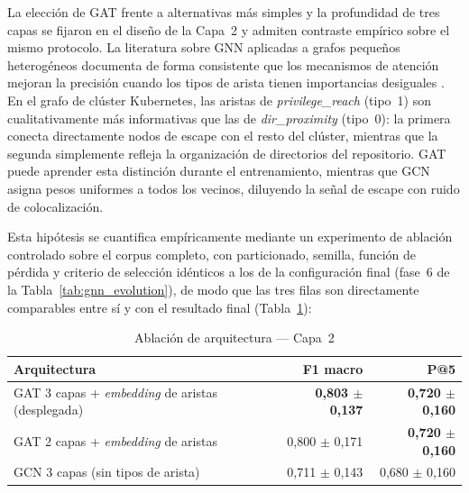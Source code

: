 La elección de \ac{GAT} frente a alternativas más simples y la profundidad de
tres capas se fijaron en el diseño de la Capa~2 y admiten contraste empírico
sobre el mismo protocolo. La literatura sobre \acs{GNN} aplicadas a grafos
pequeños heterogéneos documenta de forma consistente que los mecanismos de
atención mejoran la precisión cuando los tipos de arista tienen importancias
desiguales \citep{Velickovic2018}. En el grafo de clúster
Kubernetes, las aristas de \textit{privilege\_reach} (tipo~1) son
cualitativamente más informativas que las de \textit{dir\_proximity} (tipo~0): la
primera conecta directamente nodos de escape con el resto del clúster, mientras que
la segunda simplemente refleja la organización de directorios del repositorio.
\ac{GAT} puede aprender esta distinción durante el entrenamiento, mientras que \ac{GCN} asigna
pesos uniformes a todos los vecinos, diluyendo la señal de escape con ruido de
colocalización.

Esta hipótesis se cuantifica empíricamente mediante un experimento de ablación
controlado sobre el corpus completo, con particionado, semilla, función de
pérdida y criterio de selección idénticos a los de la configuración final
(fase~6 de la Tabla~\ref{tab:gnn_evolution}), de modo que las tres filas son
directamente comparables entre sí y con el resultado final (Tabla~\ref{tab:arch_ablation}):

\begin{table}[htbp]
\centering
\caption{Ablación de arquitectura — Capa~2}
\label{tab:arch_ablation}
\begin{tabular}{@{}lrr@{}}
\toprule
Arquitectura & F1 macro & P@5 \\
\midrule
\ac{GAT} 3 capas + \textit{embedding} de aristas (desplegada)
  & \textbf{0,803 \(\pm\) 0,137} & \textbf{0,720 \(\pm\) 0,160} \\
\ac{GAT} 2 capas + \textit{embedding} de aristas
  & 0,800 \(\pm\) 0,171 & \textbf{0,720 \(\pm\) 0,160} \\
\ac{GCN} 3 capas (sin tipos de arista)
  & 0,711 \(\pm\) 0,143 & 0,680 \(\pm\) 0,160 \\
\bottomrule
\end{tabular}
\fuentepropia
\end{table}

